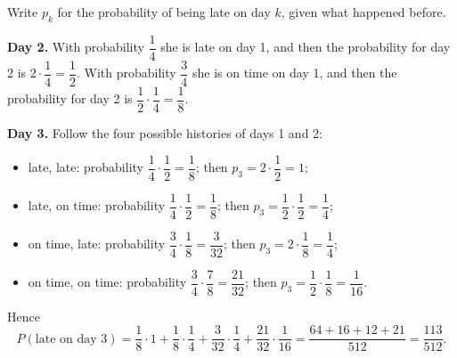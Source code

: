 Write $p_k$ for the probability of being late on day $k$, given what happened before.

\textbf{Day 2.} With probability $\dfrac{1}{4}$ she is late on day 1, and then the probability for day 2 is $2\cdot\dfrac{1}{4}=\dfrac{1}{2}$. With probability $\dfrac{3}{4}$ she is on time on day 1, and then the probability for day 2 is $\dfrac{1}{2}\cdot\dfrac{1}{4}=\dfrac{1}{8}$.

\textbf{Day 3.} Follow the four possible histories of days 1 and 2:
\begin{itemize}
\item late, late: probability $\dfrac{1}{4}\cdot\dfrac{1}{2}=\dfrac{1}{8}$; then $p_3=2\cdot\dfrac{1}{2}=1$;
\item late, on time: probability $\dfrac{1}{4}\cdot\dfrac{1}{2}=\dfrac{1}{8}$; then $p_3=\dfrac{1}{2}\cdot\dfrac{1}{2}=\dfrac{1}{4}$;
\item on time, late: probability $\dfrac{3}{4}\cdot\dfrac{1}{8}=\dfrac{3}{32}$; then $p_3=2\cdot\dfrac{1}{8}=\dfrac{1}{4}$;
\item on time, on time: probability $\dfrac{3}{4}\cdot\dfrac{7}{8}=\dfrac{21}{32}$; then $p_3=\dfrac{1}{2}\cdot\dfrac{1}{8}=\dfrac{1}{16}$.
\end{itemize}
Hence
\[
P(\text{late on day 3})=\dfrac{1}{8}\cdot1+\dfrac{1}{8}\cdot\dfrac{1}{4}+\dfrac{3}{32}\cdot\dfrac{1}{4}+\dfrac{21}{32}\cdot\dfrac{1}{16}=\dfrac{64+16+12+21}{512}=\boxed{\dfrac{113}{512}}.
\]

